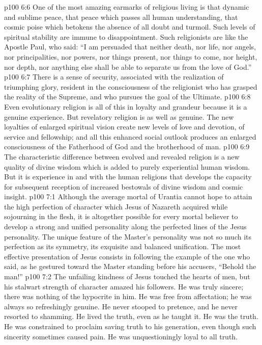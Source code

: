 \vs p100 6:6 \pc One of the most amazing earmarks of religious living is that dynamic and sublime peace, that peace which passes all human understanding, that cosmic poise which betokens the absence of all doubt and turmoil. Such levels of spiritual stability are immune to disappointment. Such religionists are like the Apostle Paul, who said: “I am persuaded that neither death, nor life, nor angels, nor principalities, nor powers, nor things present, nor things to come, nor height, nor depth, nor anything else shall be able to separate us from the love of God.”
\vs p100 6:7 There is a sense of security, associated with the realization of triumphing glory, resident in the consciousness of the religionist who has grasped the reality of the Supreme, and who pursues the goal of the Ultimate.
\vs p100 6:8 \pc Even evolutionary religion is all of this in loyalty and grandeur because it is a genuine experience. But revelatory religion is  as well as genuine. The new loyalties of enlarged spiritual vision create new levels of love and devotion, of service and fellowship; and all this enhanced social outlook produces an enlarged consciousness of the Fatherhood of God and the brotherhood of man.
\vs p100 6:9 The characteristic difference between evolved and revealed religion is a new quality of divine wisdom which is added to purely experiential human wisdom. But it is experience in and with the human religions that develops the capacity for subsequent reception of increased bestowals of divine wisdom and cosmic insight.
\vs p100 7:1 Although the average mortal of Urantia cannot hope to attain the high perfection of character which Jesus of Nazareth acquired while sojourning in the flesh, it is altogether possible for every mortal believer to develop a strong and unified personality along the perfected lines of the Jesus personality. The unique feature of the Master’s personality was not so much its perfection as its symmetry, its exquisite and balanced unification. The most effective presentation of Jesus consists in following the example of the one who said, as he gestured toward the Master standing before his accusers, “Behold the man!”
\vs p100 7:2 The unfailing kindness of Jesus touched the hearts of men, but his stalwart strength of character amazed his followers. He was truly sincere; there was nothing of the hypocrite in him. He was free from affectation; he was always so refreshingly genuine. He never stooped to pretence, and he never resorted to shamming. He lived the truth, even as he taught it. He was the truth. He was constrained to proclaim saving truth to his generation, even though such sincerity sometimes caused pain. He was unquestioningly loyal to all truth.
